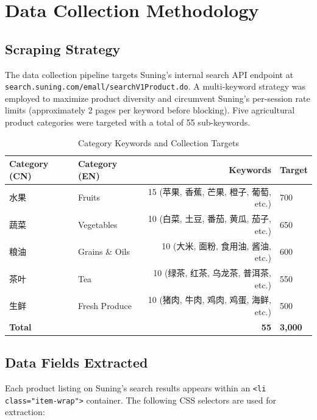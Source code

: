 \documentclass[12pt,a4paper]{report}
\begin{document}
\section{Data Collection Methodology}

\subsection{Scraping Strategy}

The data collection pipeline targets Suning's internal search API endpoint at \texttt{search.suning.com/emall/searchV1Product.do}. A multi-keyword strategy was employed to maximize product diversity and circumvent Suning's per-session rate limits (approximately 2 pages per keyword before blocking). Five agricultural product categories were targeted with a total of 55 sub-keywords.

\begin{table}[H]
  \centering
  \caption{Category Keywords and Collection Targets}
  \begin{tabular}{@{}llrl@{}}
    \toprule
    \textbf{Category (CN)} & \textbf{Category (EN)} & \textbf{Keywords} & \textbf{Target} \\
    \midrule
    水果   & Fruits           & 15 (苹果, 香蕉, 芒果, 橙子, 葡萄, etc.) & 700 \\
    蔬菜   & Vegetables       & 10 (白菜, 土豆, 番茄, 黄瓜, 茄子, etc.) & 650 \\
    粮油   & Grains \& Oils  & 10 (大米, 面粉, 食用油, 酱油, etc.)     & 600 \\
    茶叶   & Tea              & 10 (绿茶, 红茶, 乌龙茶, 普洱茶, etc.)    & 550 \\
    生鲜   & Fresh Produce    & 10 (猪肉, 牛肉, 鸡肉, 鸡蛋, 海鲜, etc.)  & 500 \\
    \midrule
    \textbf{Total} & & \textbf{55} & \textbf{3,000} \\
    \bottomrule
  \end{tabular}
\end{table}

\subsection{Data Fields Extracted}

Each product listing on Suning's search results appears within an \texttt{<li class="item-wrap">} container. The following CSS selectors are used for extraction:
\end{document}
